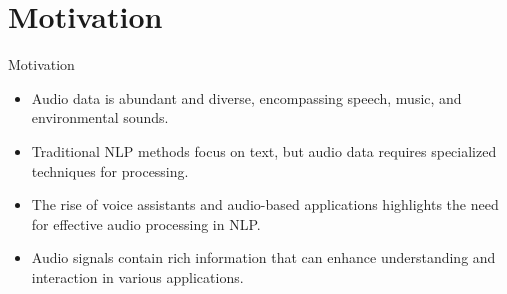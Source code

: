 \section{Motivation}
\begin{frame}{Motivation}
    \begin{itemize}
        \setlength{\itemsep}{1.5em}
        \item Audio data is abundant and diverse, encompassing speech, music, and environmental sounds.
        \item Traditional NLP methods focus on text, but audio data requires specialized techniques for processing.
        \item The rise of voice assistants and audio-based applications highlights the need for effective audio processing in NLP.
        \item Audio signals contain rich information that can enhance understanding and interaction in various applications.
    \end{itemize}
\end{frame}
